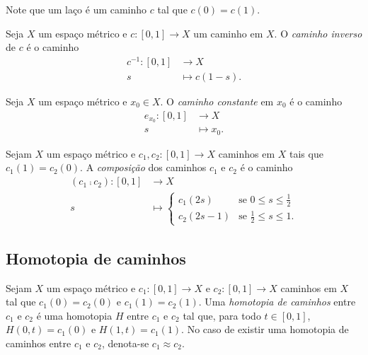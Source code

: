 Note que um laço é um caminho $c$ tal que $c(0)=c(1)$.

\begin{definition}
	Seja $X$ um espaço métrico e $c: [0,1] \to X$ um caminho em $X$. O \emph{caminho inverso} de $c$ é o caminho
	\begin{align*}
	c^{-1}: [0,1] &\to X \\
				s &\mapsto c(1-s).
	\end{align*}
\end{definition}

\begin{definition}
	Seja $X$ um espaço métrico e $x_0 \in X$. O \emph{caminho constante} em $x_0$ é o caminho
	\begin{align*}
	e_{x_0}: [0,1] &\to X \\
				s &\mapsto x_0.
	\end{align*}
\end{definition}

\begin{definition}
	Sejam $X$ um espaço métrico e $c_1,c_2: [0,1] \to X$ caminhos em $X$ tais que $c_1(1)=c_2(0)$. A \emph{composição} dos caminhos $c_1$ e $c_2$ é o caminho
	\begin{align*}
	(c_1 \comp c_2): [0,1] &\to X \\
		s &\mapsto \begin{cases}
					c_1(2s) &\text{se $0 \leq s \leq \frac{1}{2}$} \\
					c_2(2s-1) &\text{se $\frac{1}{2} \leq s \leq 1$}.
					\end{cases}
	\end{align*}
\end{definition}


\subsection{Homotopia de caminhos}

\begin{definition}
	Sejam $X$ um espaço métrico e $c_1: [0,1] \to X$ e $c_2: [0,1] \to X$ caminhos em $X$ tal que $c_1(0)=c_2(0)$ e $c_1(1)=c_2(1)$. Uma \emph{homotopia de caminhos} entre $c_1$ e $c_2$ é uma homotopia $H$ entre $c_1$ e $c_2$ tal que, para todo $t \in [0,1]$, $H(0,t)=c_1(0)$ e $H(1,t)=c_1(1)$. No caso de existir uma homotopia de caminhos entre $c_1$ e $c_2$, denota-se $c_1 \approx c_2$.
\end{definition}

